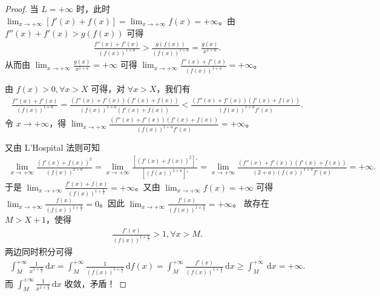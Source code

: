\documentclass[../../main.tex]{subfiles}
\begin{document}
\begin{proof}
\two 当 \( L = +\infty \) 时，此时 \( \lim_{x \to +\infty} \left[ f'(x) + f(x) \right] = \lim_{x \to +\infty} f(x) = +\infty \)。由 \( f''(x) + f'(x) > g(f(x)) \) 可得
\begin{align*}
\frac{f''(x) + f'(x)}{\left( f(x) \right)^{1 + a}} > \frac{g(f(x))}{\left( f(x) \right)^{1 + a}} = \frac{g(x)}{x^{1 + a}}.
\end{align*}
从而由 \( \lim_{x \to +\infty} \frac{g(x)}{x^{1 + a}} = +\infty \) 可得 \( \lim_{x \to +\infty} \frac{f''(x) + f'(x)}{\left( f(x) \right)^{1 + a}} = +\infty \)。

由 \( f(x) > 0, \forall x > X \) 可得，对 \( \forall x > X \)，我们有
\begin{align*}
\frac{f''(x) + f'(x)}{\left( f(x) \right)^{1 + a}} = \frac{\left( f''(x) + f'(x) \right) \left( f'(x) + f(x) \right)}{\left( f(x) \right)^{1 + a} \left( f'(x) + f(x) \right)} < \frac{\left( f''(x) + f'(x) \right) \left( f'(x) + f(x) \right)}{\left( f(x) \right)^{1 + a} f'(x)}.
\end{align*}
令 \( x \to +\infty \)，得 \( \lim_{x \to +\infty} \frac{\left( f''(x) + f'(x) \right) \left( f'(x) + f(x) \right)}{\left( f(x) \right)^{1 + a} f'(x)} = +\infty \)。

又由 L'Hospital 法则可知
\begin{align*}
\lim_{x \to +\infty} \frac{\left( f'(x) + f(x) \right)^2}{\left( f(x) \right)^{2 + a}} = \lim_{x \to +\infty} \frac{\left[ \left( f'(x) + f(x) \right)^2 \right]'}{\left[ \left( f(x) \right)^{2 + a} \right]'} = \lim_{x \to +\infty} \frac{\left( f''(x) + f'(x) \right) \left( f'(x) + f(x) \right)}{(2 + a) \left( f(x) \right)^{1 + a} f'(x)} = +\infty.
\end{align*}
于是 \( \lim_{x \to +\infty} \frac{f'(x) + f(x)}{\left( f(x) \right)^{1 + \frac{a}{2}}} = +\infty \)。又由 \( \lim_{x \to +\infty} f(x) = +\infty \) 可得 \( \lim_{x \to +\infty} \frac{f(x)}{\left( f(x) \right)^{1 + \frac{a}{2}}} = 0 \)。因此 \( \lim_{x \to +\infty} \frac{f'(x)}{\left( f(x) \right)^{1 + \frac{a}{2}}} = +\infty \)。
故存在 \( M > X + 1 \)，使得
\begin{align*}
\frac{f'(x)}{\left( f(x) \right)^{1 + \frac{a}{2}}} > 1, \forall x > M.
\end{align*}
两边同时积分可得
\begin{align*}
\int_M^{+\infty} \frac{1}{x^{1 + \frac{a}{2}}} \, \mathrm{d}x = \int_M^{+\infty} \frac{1}{\left( f(x) \right)^{1 + \frac{a}{2}}} \, \mathrm{d}f(x) = \int_M^{+\infty} \frac{f'(x)}{\left( f(x) \right)^{1 + \frac{a}{2}}} \, \mathrm{d}x \geqslant  \int_M^{+\infty} \, \mathrm{d}x = +\infty.
\end{align*}
而 \( \int_M^{+\infty} \frac{1}{x^{1 + \frac{a}{2}}} \, \mathrm{d}x \) 收敛，矛盾！
\end{proof}
\end{document}
